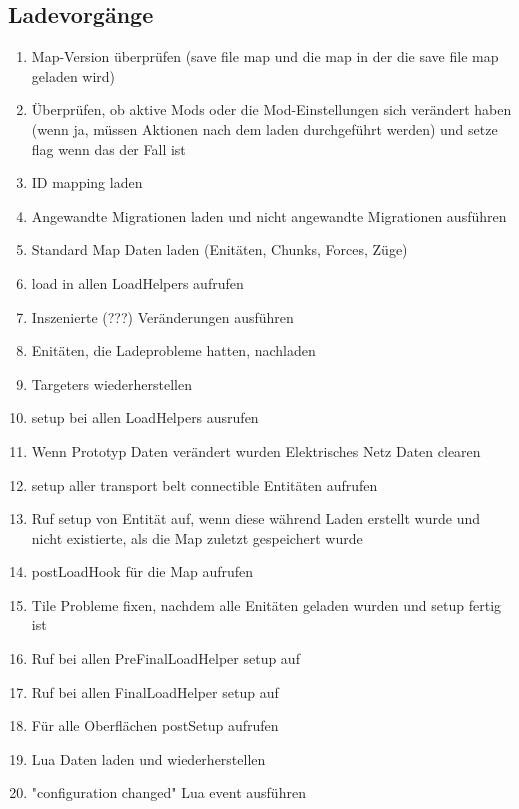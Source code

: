 \subsection{Ladevorgänge}
\begin{enumerate}
    \item Map-Version überprüfen (save file map und die map in der die save file map geladen wird)
    \item Überprüfen, ob aktive Mods oder die Mod-Einstellungen sich verändert haben (wenn ja, müssen Aktionen nach dem laden durchgeführt werden) und setze flag wenn das der Fall ist
    \item ID mapping laden
    \item Angewandte Migrationen laden und nicht angewandte Migrationen ausführen
    \item Standard Map Daten laden (Enitäten, Chunks, Forces, Züge)
    \item load in allen LoadHelpers aufrufen
    \item Inszenierte (???) Veränderungen ausführen
    \item Enitäten, die Ladeprobleme hatten, nachladen
    \item Targeters wiederherstellen
    \item setup bei allen LoadHelpers ausrufen
    \item Wenn Prototyp Daten verändert wurden Elektrisches Netz Daten clearen
    \item setup aller transport belt connectible Entitäten aufrufen
    \item Ruf setup von Entität auf, wenn diese während Laden erstellt wurde und nicht existierte, als die Map zuletzt gespeichert wurde
    \item postLoadHook für die Map aufrufen
    \item Tile Probleme fixen, nachdem alle Enitäten geladen wurden und setup fertig ist
    \item Ruf bei allen PreFinalLoadHelper setup auf
    \item Ruf bei allen FinalLoadHelper setup auf
    \item Für alle Oberflächen postSetup aufrufen
    \item Lua Daten laden und wiederherstellen
    \item "configuration changed" Lua event ausführen
\end{enumerate}



